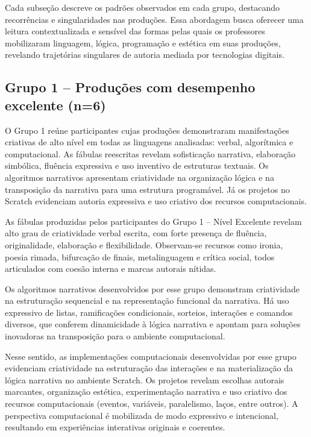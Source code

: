 \documentclass[portuguese]{textolivre}
\begin{document}
Cada subseção descreve os padrões observados em cada grupo, destacando recorrências e singularidades nas produções. Essa abordagem busca oferecer uma leitura contextualizada e sensível das formas pelas quais os professores mobilizaram linguagem, lógica, programação e estética em suas produções, revelando trajetórias singulares de autoria mediada por tecnologias digitais.

\subsection{Grupo 1 – Produções com desempenho excelente (n=6)}

O Grupo 1 reúne participantes cujas produções demonstraram manifestações criativas de alto nível em todas as linguagens analisadas: verbal, algorítmica e computacional. As fábulas reescritas revelam sofisticação narrativa, elaboração simbólica, fluência expressiva e uso inventivo de estruturas textuais. Os algoritmos narrativos apresentam criatividade na organização lógica e na transposição da narrativa para uma estrutura programável. Já os projetos no Scratch evidenciam autoria expressiva e uso criativo dos recursos computacionais.

As fábulas produzidas pelos participantes do Grupo 1 – Nível Excelente revelam alto grau de criatividade verbal escrita, com forte presença de fluência, originalidade, elaboração e flexibilidade. Observam-se recursos como ironia, poesia rimada, bifurcação de finais, metalinguagem e crítica social, todos articulados com coesão interna e marcas autorais nítidas.

Os algoritmos narrativos desenvolvidos por esse grupo demonstram criatividade na estruturação sequencial e na representação funcional da narrativa. Há uso expressivo de listas, ramificações condicionais, sorteios, interações e comandos diversos, que conferem dinamicidade à lógica narrativa e apontam para soluções inovadoras na transposição para o ambiente computacional.

Nesse sentido, as implementações computacionais desenvolvidas por esse grupo evidenciam criatividade na estruturação das interações e na materialização da lógica narrativa no ambiente Scratch. Os projetos revelam escolhas autorais marcantes, organização estética, experimentação narrativa e uso criativo dos recursos computacionais (eventos, variáveis, paralelismo, laços, entre outros). A perspectiva computacional é mobilizada de modo expressivo e intencional, resultando em experiências interativas originais e coerentes.
\end{document}
